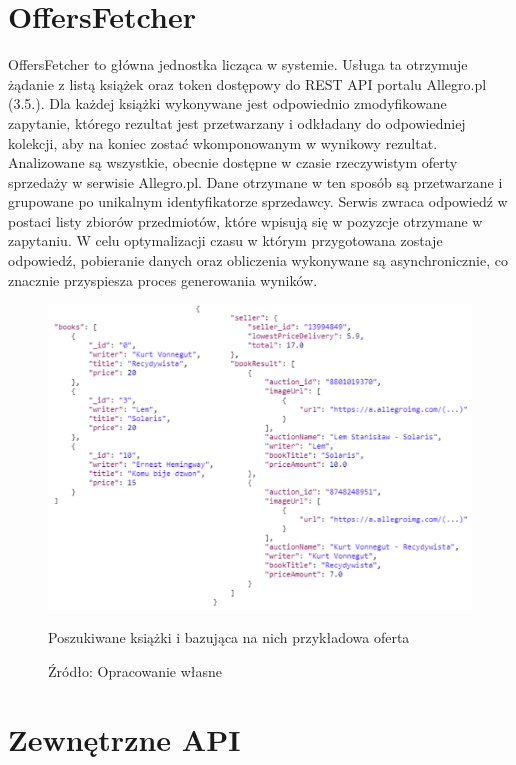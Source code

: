 \section{OffersFetcher}
OffersFetcher to główna jednostka licząca w systemie. Usługa ta otrzymuje żądanie z listą książek oraz token dostępowy do REST API portalu Allegro.pl (3.5.).
Dla każdej książki wykonywane jest odpowiednio zmodyfikowane zapytanie, którego rezultat jest przetwarzany i odkładany do odpowiedniej kolekcji, aby na koniec zostać wkomponowanym w wynikowy rezultat. Analizowane są wszystkie, obecnie dostępne w czasie rzeczywistym oferty sprzedaży w serwisie Allegro.pl. Dane otrzymane w ten sposób są przetwarzane i grupowane po unikalnym identyfikatorze sprzedawcy. Serwis zwraca odpowiedź w postaci listy zbiorów przedmiotów, które wpisują się w pozyzcje otrzymane w zapytaniu. W celu optymalizacji czasu w którym przygotowana zostaje odpowiedź, pobieranie danych oraz obliczenia wykonywane są asynchronicznie, co znacznie przyspiesza proces generowania wyników.
\begin{figure}[H]
	\centering
	\includegraphics[width=\linewidth]{booksToOffers.pdf}
	\caption{\centering Poszukiwane książki i bazująca na nich przykładowa oferta}
	\caption*{\centering Źródło: {Opracowanie własne}}
\end{figure}

\section{Zewnętrzne API}

